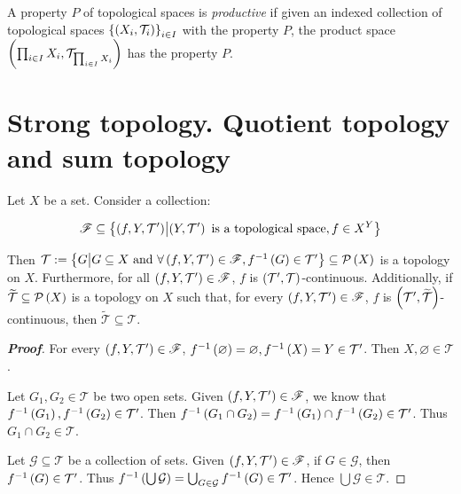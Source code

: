 \begin{definition}
  A property $P$ of topological spaces is \textit{productive} if given an indexed collection of topological spaces $\left\{\left(X_i,\mathcal{T}_i\right)\right\}_{i\in I}$ with the property $P$, the product space $\left(\prod_{i\in I}{X_i},\mathcal{T}_{\prod_{i\in I}{X_i}}\right)$ has the property $P$.
\end{definition}

\section{Strong topology. Quotient topology and sum topology}

\begin{proposition}
  Let $X$ be a set. Consider a collection:
  
  \begin{equation}
    \mathscr{F}\subseteq\left\{\left(f,Y,\mathcal{T}'\right)\middle|\left(Y,\mathcal{T}'\right)\text{ is a topological space}, f\in X^Y\right\}
  \end{equation}

  Then $\mathcal{T}:=\left\{G\middle|G\subseteq X\text{ and }\forall\left(f,Y,\mathcal{T}'\right)\in\mathscr{F},f^{-1}\left(G\right)\in\mathcal{T}'\right\}\subseteq\mathcal{P}\left(X\right)$ is a topology on $X$. Furthermore, for all $\left(f,Y,\mathcal{T}'\right)\in\mathscr{F}$, $f$ is $\left(\mathcal{T}',\mathcal{T}\right)$-continuous. Additionally, if $\widetilde{\mathcal{T}}\subseteq\mathcal{P}\left(X\right)$ is a topology on $X$ such that, for every $\left(f,Y,\mathcal{T}'\right)\in\mathscr{F}$, $f$ is $\left(\mathcal{T}',\widetilde{\mathcal{T}}\right)$-continuous, then $\widetilde{\mathcal{T}}\subseteq\mathcal{T}$.

  \begin{proof}[\rm\textbf{Proof}]
    For every $\left(f,Y,\mathcal{T}'\right)\in\mathscr{F}$, $f^{-1}\left(\varnothing\right)=\varnothing,f^{-1}\left(X\right)=Y\in\mathcal{T}'$. Then $X,\varnothing\in\mathcal{T}$.

    Let $G_1,G_2\in\mathcal{T}$ be two open sets. Given $\left(f,Y,\mathcal{T}'\right)\in\mathscr{F}$, we know that $f^{-1}\left(G_1\right),f^{-1}\left(G_2\right)\in\mathcal{T}'$. Then $f^{-1}\left(G_1\cap G_2\right)=f^{-1}\left(G_1\right)\cap f^{-1}\left(G_2\right)\in\mathcal{T}'$. Thus $G_1\cap G_2\in\mathcal{T}$.

    Let $\mathcal{G}\subseteq\mathcal{T}$ be a collection of sets. Given $\left(f,Y,\mathcal{T}'\right)\in\mathscr{F}$, if $G\in\mathcal{G}$, then $f^{-1}\left(G\right)\in\mathcal{T}'$. Thus $f^{-1}\left(\bigcup{\mathcal{G}}\right)=\bigcup_{G\in\mathcal{G}}{f^{-1}\left(G\right)}\in\mathcal{T}'$. Hence $\bigcup{\mathcal{G}}\in\mathcal{T}$.


\end{proof}
\end{proposition}
